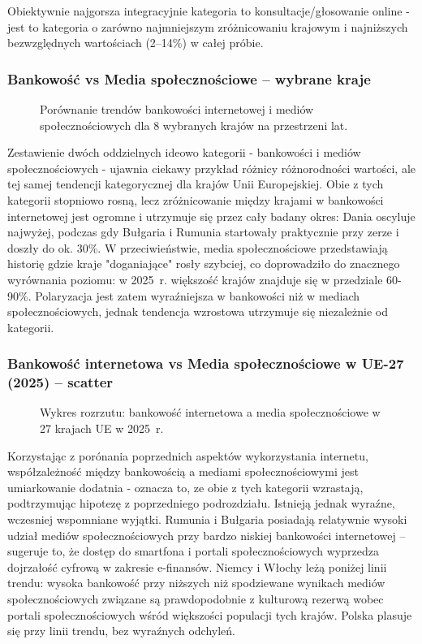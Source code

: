 \documentclass[12pt]{article}
\begin{document}
Obiektywnie najgorsza integracyjnie kategoria to konsultacje/głosowanie online - jest to kategoria o zarówno najmniejszym zróżnicowaniu krajowym
i najniższych bezwzględnych wartościach (2--14\%) w całej próbie.

\newpage




\subsubsection{Bankowość vs Media społecznościowe – wybrane kraje}

\begin{figure}[H]
    
    \caption{Porównanie trendów bankowości internetowej i mediów społecznościowych dla 8 wybranych krajów na przestrzeni lat.}
\end{figure}

Zestawienie dwóch oddzielnych ideowo kategorii - bankowości i mediów społecznościowych - ujawnia ciekawy przykład różnicy różnorodności wartości, 
ale tej samej tendencji kategorycznej dla krajów Unii Europejskiej.
Obie z tych kategorii stopniowo rosną, lecz zróżnicowanie między krajami w bankowości internetowej jest ogromne i utrzymuje się przez cały badany okres:
Dania oscyluje najwyżej, podczas gdy Bułgaria i Rumunia startowały praktycznie przy zerze i doszły do ok. 30\%. W przeciwieństwie, media społecznościowe 
przedstawiają historię gdzie kraje "doganiające" rosły szybciej, co doprowadziło do znacznego wyrównania poziomu: w 2025~r. większość krajów znajduje się
w przedziale 60-90\%. Polaryzacja jest zatem wyraźniejsza w bankowości niż w mediach społecznościowych, jednak tendencja wzrostowa utrzymuje się 
niezależnie od kategorii.




\subsubsection{Bankowość internetowa vs Media społecznościowe w UE-27 (2025) – scatter}

\begin{figure}[H]
    
    \caption{Wykres rozrzutu: bankowość internetowa a media społecznościowe w 27 krajach UE w 2025~r.}
\end{figure}

Korzystając z porónania poprzednich aspektów wykorzystania internetu, współzależność między bankowością a mediami społecznościowymi jest
umiarkowanie dodatnia - oznacza to, ze obie z tych kategorii wzrastają, podtrzymując hipotezę z poprzedniego podrozdziału.
Istnieją jednak wyraźne, wczesniej wspomniane wyjątki. Rumunia i Bułgaria posiadają relatywnie wysoki udział mediów społecznościowych
przy bardzo niskiej bankowości internetowej – sugeruje to, że dostęp do smartfona i portali społecznościowych wyprzedza dojrzałość cyfrową
w zakresie e-finansów.
Niemcy i Włochy leżą poniżej linii trendu: wysoka bankowość przy niższych niż spodziewane wynikach mediów społecznościowych związane są
prawdopodobnie z kulturową rezerwą wobec portali społecznościowych wśród większości populacji tych krajów. Polska plasuje się przy linii trendu,
bez wyraźnych odchyleń.
\end{document}
